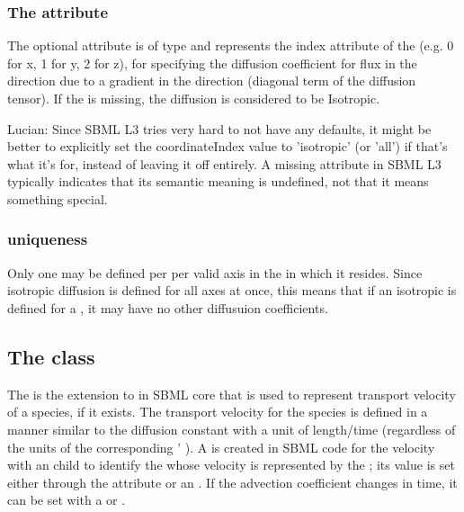 \subsubsection{The  attribute}
The optional  attribute is of type  and represents the index attribute of the \CoordinateComponent (e.g. 0 for x, 1 for y, 2 for z), for specifying the diffusion coefficient for flux in the  direction due to a gradient in the  direction (diagonal term of the diffusion tensor).  If the  is missing, the diffusion is considered to be Isotropic.

{\color{red} Lucian: \notice Since SBML L3 tries very hard to not have any defaults, it might be better to explicitly set the coordinateIndex value to 'isotropic' (or 'all') if that's what it's for, instead of leaving it off entirely.  A missing attribute in SBML L3 typically indicates that its semantic meaning is undefined, not that it means something special.}

\subsubsection{\DiffusionCoefficient uniqueness}
Only one \DiffusionCoefficient may be defined per \Species per valid axis in the \Compartment in which it resides.  Since isotropic diffusion is defined for all axes at once, this means that if an isotropic \DiffusionCoefficient is defined for a \Species, it may have no other diffusuion coefficients.


\subsection{The  class}
\label{AdvectionCoefficient-class}
The \AdvectionCoefficient is the extension to \Parameter in SBML core that is used to represent transport velocity of a species, if it exists. The transport velocity for the species is defined in a manner similar to the diffusion constant with a unit of length/time (regardless of the units of the corresponding \Species' ).  A \Parameter is created in SBML code for the velocity with an \AdvectionCoefficient child to identify the \Species whose velocity is represented by the \Parameter; its value is set either through the  attribute or an \InitialAssignment.    If the advection coefficient changes in time, it can be set with a \Rule or \Event.


